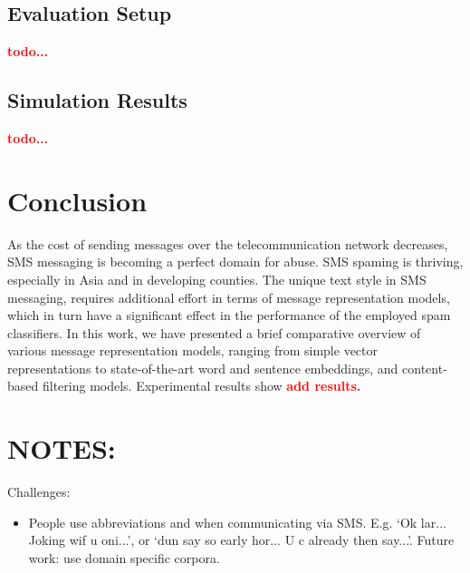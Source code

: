 \documentclass[letterpaper]{article}
\newcommand{\note}[1]{\textbf{\textcolor{red}{#1}}}
\begin{document}
\subsection{Evaluation Setup}  \label{Evaluation Setup}

\note{todo...}

\subsection{Simulation Results}  \label{Simulation Results}

\note{todo...}

\section{Conclusion} \label{Conclusion}

As the cost of sending messages over the telecommunication network decreases, SMS messaging is becoming a perfect domain for abuse. SMS spaming is thriving, especially in Asia and in developing counties. The unique text style in SMS messaging, requires additional effort in terms of message representation models, which in turn have a significant effect in the performance of the employed spam classifiers. In this work, we have presented a brief comparative overview of various message representation models, ranging from simple vector representations to state-of-the-art word and sentence embeddings, and content-based filtering models. Experimental results show \note{add results.}

\section{NOTES:} \label{notes}

Challenges:
\begin{itemize}
	\item People use abbreviations and  when communicating via SMS. E.g. `Ok lar... Joking wif u oni...', or `dun say so early hor... U c already then say...'. Future work: use domain specific corpora.
\end{itemize}

% 
% 


\end{document}
